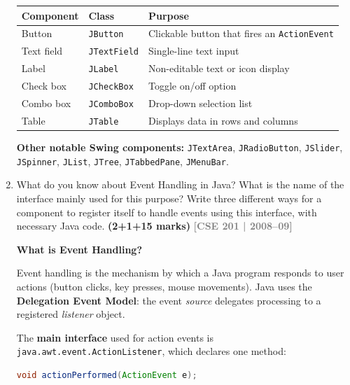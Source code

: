 \documentclass[12pt,a3paper]{article}
\newcommand{\yr}[1]{\hfill\textcolor{gray}{\small\textbf{[#1]}}}
\newcommand{\mk}[1]{\textcolor{orange!70!black}{\small\textbf{(#1 marks)}}}
\begin{document}
\begin{enumerate}
\begin{tcolorbox}
\begin{center}
\small
\begin{tabular}{@{}lll@{}}
\toprule
\textbf{Component} & \textbf{Class} & \textbf{Purpose} \\
\midrule
Button     & \texttt{JButton}    &
  Clickable button that fires an \texttt{ActionEvent} \\
Text field & \texttt{JTextField} &
  Single-line text input \\
Label      & \texttt{JLabel}     &
  Non-editable text or icon display \\
Check box  & \texttt{JCheckBox}  &
  Toggle on/off option \\
Combo box  & \texttt{JComboBox}  &
  Drop-down selection list \\
Table      & \texttt{JTable}     &
  Displays data in rows and columns \\
\bottomrule
\end{tabular}
\end{center}

\textbf{Other notable Swing components:}
\texttt{JTextArea}, \texttt{JRadioButton},
\texttt{JSlider}, \texttt{JSpinner},
\texttt{JList}, \texttt{JTree},
\texttt{JTabbedPane}, \texttt{JMenuBar}.

\end{tcolorbox}



\item What do you know about Event Handling in Java? What is the name of the interface mainly used for this purpose? Write three different ways for a component to register itself to handle events using this interface, with necessary Java code. \mk{2+1+15}
\yr{CSE 201 | 2008--09}


\begin{tcolorbox}[enhanced,breakable,ansbox,
  colback=cC!4,colframe=cC,boxrule=0.8pt,arc=5pt,
  title={\textbf{Answer — Event Handling in Java;
  Three Ways Using ActionListener}},
  fonttitle=\bfseries\color{white},colbacktitle=cC]

\textbf{What is Event Handling?}

Event handling is the mechanism by which a Java
program responds to user actions (button clicks,
key presses, mouse movements). Java uses the
\textbf{Delegation Event Model}: the event
\emph{source} delegates processing to a registered
\emph{listener} object.

The \textbf{main interface} used for action events
is \texttt{java.awt.event.ActionListener}, which
declares one method:
\begin{lstlisting}[language=Java]
void actionPerformed(ActionEvent e);
\end{lstlisting}


\end{tcolorbox}
\end{enumerate}
\end{document}
